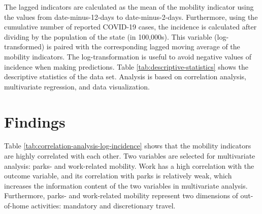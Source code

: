 \documentclass[]{elsarticle} %
\begin{document}
The lagged indicators are calculated as the mean of the mobility
indicator using the values from date-minus-12-days to date-minus-2-days.
Furthermore, using the cumulative number of reported COVID-19 cases, the
incidence is calculated after dividing by the population of the state
(in 100,000s). This variable (log-transformed) is paired with the
corresponding lagged moving average of the mobility indicators. The
log-transformation is useful to avoid negative values of incidence when
making predictions. Table \ref{tab:descriptive-statistics} shows the
descriptive statistics of the data set. Analysis is based on correlation
analysis, multivariate regression, and data visualization.

\hypertarget{findings}{%
\section{Findings}\label{findings}}

Table \ref{tab:correlation-analysis-log-incidence} shows that the
mobility indicators are highly correlated with each other. Two variables
are selected for multivariate analysis: parks- and work-related
mobility. Work has a high correlation with the outcome variable, and its
correlation with parks is relatively weak, which increases the
information content of the two variables in multivariate analysis.
Furthermore, parks- and work-related mobility represent two dimensions
of out-of-home activities: mandatory and discretionary travel.

\begin{table}

\caption{\label{tab:check-correlations-log-incidence}\label{tab:correlation-analysis-log-incidence}Simple correlation between log(incidence) and the mobility indicators}
\centering
{}
\end{table}
\end{document}
